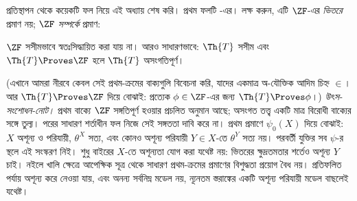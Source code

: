 \documentclass[../../../include/open-logic-section]{subfiles}
\begin{document}
প্রতিস্থাপন থেকে কয়েকটি ফল নিয়ে এই
অধ্যায় শেষ করি। প্রথম ফলটি
\citet{Montague1961}-এর। লক্ষ করুন,
এটি $\ZF$-এর \emph{ভিতরে} প্রমাণ নয়;
$\ZF$ \emph{সম্পর্কে} প্রমাণ:
\begin{thm}
	$\ZF$ সসীমভাবে স্বতঃসিদ্ধায়িত করা
	যায় না। আরও সাধারণভাবে: $\Th{T}$
	সসীম এবং $\Th{T} \Proves \ZF$ হলে
	$\Th{T}$ অসংগতিপূর্ণ।

	(এখানে আমরা নীরবে কেবল সেই
	প্রথম-ক্রমের বাক্যগুলি বিবেচনা করি,
	যাদের একমাত্র অ-যৌক্তিক আদিম চিহ্ন
	$\in$। আর $\Th{T} \Proves \ZF$
	দিয়ে বোঝাই: প্রত্যেক $\phi \in \ZF$-এর
	জন্য $\Th{T} \Proves \phi$।)
\emph{উৎস-সংশোধন-নোট।} প্রথম বাক্যে $\ZF$ সঙ্গতিপূর্ণ
হওয়ার প্রচলিত অনুমান আছে; অসংগত তত্ত্ব একটি মাত্র বিরোধী
বাক্যের সঙ্গে তুল্য। পরের সাধারণ শর্তাধীন ফল নিজে সেই
সঙ্গততা দাবি করে না। প্রথম প্রমাণে $\psi_0(X)$ দিয়ে
বোঝাই: $X$ অশূন্য ও পরিযায়ী, $\theta^X$ সত্য, এবং
কোনও অশূন্য পরিযায়ী $Y\in X$-তে $\theta^Y$ সত্য নয়।
পরবর্তী যুক্তির সব $\psi$-র স্থলে এই সংস্করণ নিই।
শুধু বাইরের $X$-তে অশূন্যতা যোগ করা যথেষ্ট নয়: ভিতরের
ক্ষুদ্রতমতার শর্তেও অশূন্য $Y$ চাই। নইলে খালি ক্ষেত্রে
আপেক্ষিক সূত্র থেকে সাধারণ প্রথম-ক্রমের প্রমাণের বিশুদ্ধতা
প্রয়োগ বৈধ নয়। প্রতিফলিত পর্যায় অশূন্য করে নেওয়া যায়,
এবং অনন্য সর্বনিম্ন মডেল নয়, ন্যূনতম স্তরাঙ্কের একটি
অশূন্য পরিযায়ী মডেল বাছলেই যথেষ্ট।
\end{thm}
\end{document}
